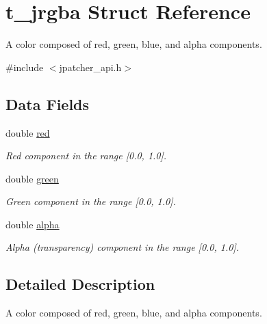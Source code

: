 \hypertarget{structt__jrgba}{
\section{t\_\-jrgba Struct Reference}
\label{structt__jrgba}
}


A color composed of red, green, blue, and alpha components.  


{\ttfamily \#include $<$jpatcher\_\-api.h$>$}\subsection*{Data Fields}
\begin{DoxyCompactItemize}
\item 
\hypertarget{structt__jrgba_a94003046e8f727489b81a1804939e28d}{
double \hyperlink{structt__jrgba_a94003046e8f727489b81a1804939e28d}{red}}
\label{structt__jrgba_a94003046e8f727489b81a1804939e28d}

\begin{DoxyCompactList}\small\item\em Red component in the range \mbox{[}0.0, 1.0\mbox{]}. \item\end{DoxyCompactList}\item 
\hypertarget{structt__jrgba_a2055e7618635a250b70d4f724894ab52}{
double \hyperlink{structt__jrgba_a2055e7618635a250b70d4f724894ab52}{green}}
\label{structt__jrgba_a2055e7618635a250b70d4f724894ab52}

\begin{DoxyCompactList}\small\item\em Green component in the range \mbox{[}0.0, 1.0\mbox{]}. \item\end{DoxyCompactList}\item 
\hypertarget{structt__jrgba_a04f9ec088510b4d0faf52bc42357550b}{
double \hyperlink{structt__jrgba_a04f9ec088510b4d0faf52bc42357550b}{alpha}}
\label{structt__jrgba_a04f9ec088510b4d0faf52bc42357550b}

\begin{DoxyCompactList}\small\item\em Alpha (transparency) component in the range \mbox{[}0.0, 1.0\mbox{]}. \item\end{DoxyCompactList}\end{DoxyCompactItemize}


\subsection{Detailed Description}
A color composed of red, green, blue, and alpha components. 